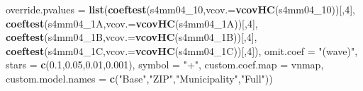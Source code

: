 \documentclass[
]{article}
\newenvironment{Shaded}{\begin{snugshade}}{\end{snugshade}}
\newcommand{\DataTypeTok}[1]{\textcolor[rgb]{0.13,0.29,0.53}{#1}}
\newcommand{\DecValTok}[1]{\textcolor[rgb]{0.00,0.00,0.81}{#1}}
\newcommand{\FloatTok}[1]{\textcolor[rgb]{0.00,0.00,0.81}{#1}}
\newcommand{\KeywordTok}[1]{\textcolor[rgb]{0.13,0.29,0.53}{\textbf{#1}}}
\newcommand{\NormalTok}[1]{#1}
\newcommand{\StringTok}[1]{\textcolor[rgb]{0.31,0.60,0.02}{#1}}
\begin{document}
\begin{Shaded}
\begin{Highlighting}[]
          \DataTypeTok{override.pvalues =} \KeywordTok{list}\NormalTok{(}\KeywordTok{coeftest}\NormalTok{(s4mm04_}\DecValTok{10}\NormalTok{,}\DataTypeTok{vcov.=}\KeywordTok{vcovHC}\NormalTok{(s4mm04_}\DecValTok{10}\NormalTok{))[,}\DecValTok{4}\NormalTok{],}
                                  \KeywordTok{coeftest}\NormalTok{(s4mm04_1A,}\DataTypeTok{vcov.=}\KeywordTok{vcovHC}\NormalTok{(s4mm04_1A))[,}\DecValTok{4}\NormalTok{],}
                                  \KeywordTok{coeftest}\NormalTok{(s4mm04_1B,}\DataTypeTok{vcov.=}\KeywordTok{vcovHC}\NormalTok{(s4mm04_1B))[,}\DecValTok{4}\NormalTok{],}
                                  \KeywordTok{coeftest}\NormalTok{(s4mm04_1C,}\DataTypeTok{vcov.=}\KeywordTok{vcovHC}\NormalTok{(s4mm04_1C))[,}\DecValTok{4}\NormalTok{]),}
          \DataTypeTok{omit.coef =} \StringTok{"(wave)"}\NormalTok{, }\DataTypeTok{stars =} \KeywordTok{c}\NormalTok{(}\FloatTok{0.1}\NormalTok{,}\FloatTok{0.05}\NormalTok{,}\FloatTok{0.01}\NormalTok{,}\FloatTok{0.001}\NormalTok{), }\DataTypeTok{symbol =} \StringTok{"+"}\NormalTok{,}
          \DataTypeTok{custom.coef.map =}\NormalTok{ vnmap, }
          \DataTypeTok{custom.model.names =} \KeywordTok{c}\NormalTok{(}\StringTok{"Base"}\NormalTok{,}\StringTok{"ZIP"}\NormalTok{,}\StringTok{"Municipality"}\NormalTok{,}\StringTok{"Full"}\NormalTok{))}
\end{Highlighting}
\end{Shaded}
\end{document}
